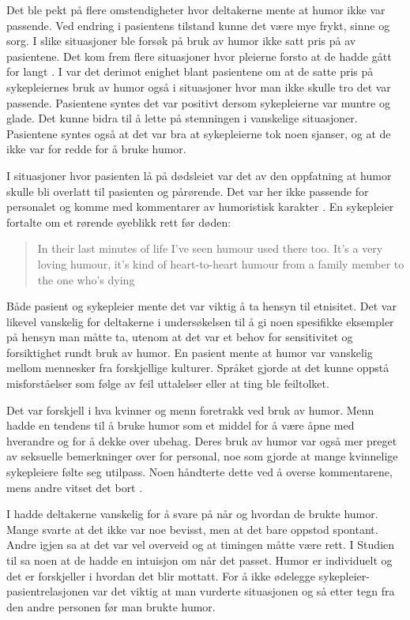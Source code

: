Det ble pekt på flere omstendigheter hvor deltakerne mente at humor ikke var
passende. Ved endring i pasientens tilstand kunne det være mye frykt, sinne og
sorg. I slike situasjoner ble forsøk på bruk av humor ikke satt pris på av
pasientene. Det kom frem flere situasjoner hvor pleierne forsto at de hadde
gått for langt \cite{dean2005}. I  var det derimot
enighet blant pasientene om at de satte pris på sykepleiernes bruk av humor
også i situasjoner hvor man ikke skulle tro det var passende. Pasientene syntes
det var positivt dersom sykepleierne var muntre og glade. Det kunne bidra til å
lette på stemningen i vanskelige situasjoner. Pasientene syntes også at det var
bra at sykepleierne tok noen sjanser, og at de ikke var for redde for å bruke
humor.

I situasjoner hvor pasienten lå på dødsleiet var det av den oppfatning at humor
skulle bli overlatt til pasienten og pårørende. Det var her ikke passende for
personalet og komme med kommentarer av humoristisk karakter \cite{dean2005}.
En sykepleier fortalte om et rørende øyeblikk rett før døden:
\blockquote[{}]{In their last minutes of life I've seen
humour used there too. It's a very loving humour, it's kind of heart-to-heart
humour from a family member to the one who's dying}.

Både pasient og sykepleier mente det var viktig å ta hensyn til etnisitet. Det
var likevel vanskelig for deltakerne i undersøkelsen til  å gi
noen spesifikke eksempler på hensyn man måtte ta, utenom at det var et behov
for sensitivitet og forsiktighet rundt bruk av humor. En pasient mente at humor
var vanskelig mellom mennesker fra forskjellige kulturer. Språket gjorde at det
kunne oppstå misforståelser som følge av feil uttalelser eller at ting ble
feiltolket.

Det var forskjell i hva kvinner og menn foretrakk ved bruk av humor. Menn hadde
en tendens til å bruke humor som et middel for å være åpne med hverandre og for
å dekke over ubehag. Deres bruk av humor var også mer preget av seksuelle
bemerkninger over for personal, noe som gjorde at mange kvinnelige sykepleiere
følte seg utilpass. Noen håndterte dette ved å overse kommentarene, mens andre
vitset det bort \cite{dean2005}.

I  hadde deltakerne vanskelig for å svare på når og hvordan de
brukte humor. Mange svarte at det ikke var noe bevisst, men at det bare oppstod
spontant. Andre igjen sa at det var vel overveid og at timingen måtte være
rett. I Studien til  sa noen at de hadde en intuisjon om når
det passet. Humor er individuelt og det er forskjeller i hvordan det blir
mottatt. For å ikke ødelegge sykepleier-pasientrelasjonen var det viktig at man
vurderte situasjonen og så etter tegn fra den andre personen før man brukte
humor.

